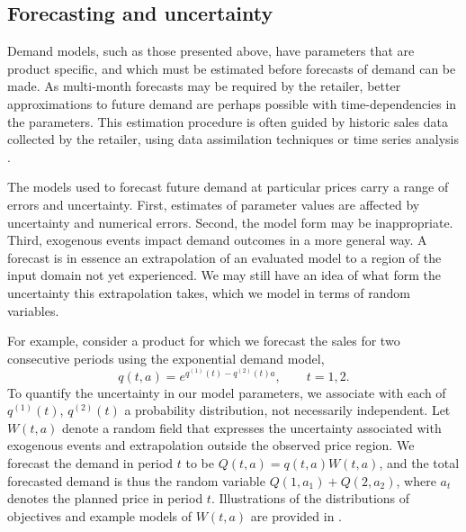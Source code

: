\documentclass[main.tex]{subfiles}
\begin{document}
\subsection{Forecasting and uncertainty}
Demand models, such as those presented above, have parameters that are
product specific, and which must be estimated before forecasts of
demand can be made.
As multi-month forecasts may be required by the retailer, better
approximations to future demand are perhaps possible with
time-dependencies in the parameters.
This estimation procedure is often guided by
historic sales data collected by the retailer, using data assimilation
techniques \citep{law2015data,riseth2017operator} or time series analysis
\citep{chatfield2004analysis}.

The models used to forecast future demand at particular prices carry
a range of errors and uncertainty. First, estimates of parameter
values are affected by uncertainty and numerical errors. Second, the model form may be
inappropriate. Third, exogenous events impact demand outcomes in a more general
way.
A forecast is in essence an extrapolation of an evaluated model to a
region of the input domain not yet experienced. We may still have an
idea of what form the uncertainty this extrapolation takes, which
we model in terms of random variables.

For example, consider a product for which we forecast the sales for
two consecutive periods using the exponential demand model,
\begin{equation}
  q(t,a) =
  e^{q^{(1)}(t)-q^{(2)}(t)a},\qquad t=1,2.
\end{equation}
To quantify the uncertainty in our model parameters, we associate
with each of $q^{(1)}(t)$, $q^{(2)}(t)$ a probability distribution, not
necessarily independent.
Let $W(t,a)$ denote a random field that expresses the uncertainty
associated with exogenous events and extrapolation outside the
observed price region.
We forecast the demand in period $t$ to be $Q(t,a)=q(t,a)W(t,a)$, and
the total forecasted demand is thus the random variable $Q(1,a_1) +
Q(2,a_2)$, where $a_t$ denotes the planned price in period $t$.
Illustrations of the distributions of objectives and example models of
$W(t,a)$ are provided in
.
\end{document}
